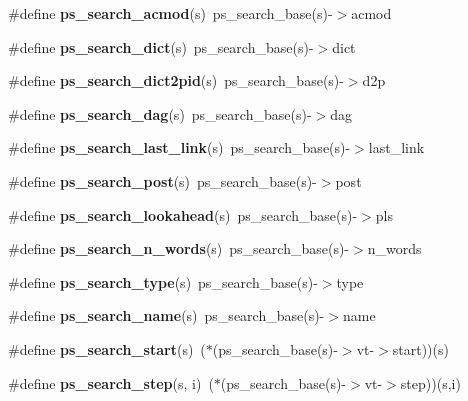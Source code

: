 \begin{DoxyCompactItemize}
\item 
\mbox{\label{pocketsphinx__internal_8h_a03b1edeb67c83451296c2d99b22621a9}} 
\#define {\bfseries ps\+\_\+search\+\_\+acmod}(s)~ps\+\_\+search\+\_\+base(s)-\/$>$acmod
\item 
\mbox{\label{pocketsphinx__internal_8h_ae2aad02cace01fbb2f345a0ead69c672}} 
\#define {\bfseries ps\+\_\+search\+\_\+dict}(s)~ps\+\_\+search\+\_\+base(s)-\/$>$dict
\item 
\mbox{\label{pocketsphinx__internal_8h_a5c91d7c3f11ba5b938705d1fe65676f9}} 
\#define {\bfseries ps\+\_\+search\+\_\+dict2pid}(s)~ps\+\_\+search\+\_\+base(s)-\/$>$d2p
\item 
\mbox{\label{pocketsphinx__internal_8h_a90e5addd9875c355d99208246802f7d8}} 
\#define {\bfseries ps\+\_\+search\+\_\+dag}(s)~ps\+\_\+search\+\_\+base(s)-\/$>$dag
\item 
\mbox{\label{pocketsphinx__internal_8h_a9ae7d942e4206b4184cc073a87d2dc82}} 
\#define {\bfseries ps\+\_\+search\+\_\+last\+\_\+link}(s)~ps\+\_\+search\+\_\+base(s)-\/$>$last\+\_\+link
\item 
\mbox{\label{pocketsphinx__internal_8h_ac8707bfd426dfd0eceb1e57836c0ac91}} 
\#define {\bfseries ps\+\_\+search\+\_\+post}(s)~ps\+\_\+search\+\_\+base(s)-\/$>$post
\item 
\mbox{\label{pocketsphinx__internal_8h_a890584ac65d28cd404d66adf631fac7c}} 
\#define {\bfseries ps\+\_\+search\+\_\+lookahead}(s)~ps\+\_\+search\+\_\+base(s)-\/$>$pls
\item 
\mbox{\label{pocketsphinx__internal_8h_aaba5c849ae487b5a3fff0210f4687e25}} 
\#define {\bfseries ps\+\_\+search\+\_\+n\+\_\+words}(s)~ps\+\_\+search\+\_\+base(s)-\/$>$n\+\_\+words
\item 
\mbox{\label{pocketsphinx__internal_8h_a0dddf728c44bd7f9e58bdacab032e9eb}} 
\#define {\bfseries ps\+\_\+search\+\_\+type}(s)~ps\+\_\+search\+\_\+base(s)-\/$>$type
\item 
\mbox{\label{pocketsphinx__internal_8h_a6ff1216eb4c0053ecdfe6096d79f02f7}} 
\#define {\bfseries ps\+\_\+search\+\_\+name}(s)~ps\+\_\+search\+\_\+base(s)-\/$>$name
\item 
\mbox{\label{pocketsphinx__internal_8h_ac905db8dfa65727e787c44f40d80239c}} 
\#define {\bfseries ps\+\_\+search\+\_\+start}(s)~($\ast$(ps\+\_\+search\+\_\+base(s)-\/$>$vt-\/$>$start))(s)
\item 
\mbox{\label{pocketsphinx__internal_8h_a3e3be8540f1e419fe4dfa1a063c4e8be}} 
\#define {\bfseries ps\+\_\+search\+\_\+step}(s,  i)~($\ast$(ps\+\_\+search\+\_\+base(s)-\/$>$vt-\/$>$step))(s,i)

\end{DoxyCompactItemize}
